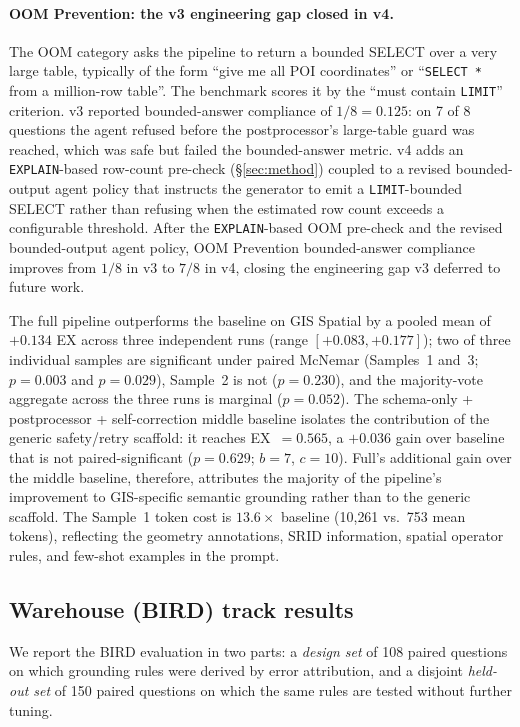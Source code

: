 \documentclass[11pt]{article}
\begin{document}
\paragraph{OOM Prevention: the v3 engineering gap closed in v4.} The OOM category asks the pipeline to return a bounded SELECT over a very large table, typically of the form ``give me all POI coordinates'' or ``\texttt{SELECT *} from a million-row table''. The benchmark scores it by the ``must contain \texttt{LIMIT}'' criterion. v3 reported bounded-answer compliance of $1/8 = 0.125$: on 7 of 8 questions the agent refused before the postprocessor's large-table guard was reached, which was safe but failed the bounded-answer metric. v4 adds an \texttt{EXPLAIN}-based row-count pre-check (\S\ref{sec:method}) coupled to a revised bounded-output agent policy that instructs the generator to emit a \texttt{LIMIT}-bounded SELECT rather than refusing when the estimated row count exceeds a configurable threshold. After the \texttt{EXPLAIN}-based OOM pre-check and the revised bounded-output agent policy, OOM Prevention bounded-answer compliance improves from $1/8$ in v3 to $7/8$ in v4, closing the engineering gap v3 deferred to future work.

The full pipeline outperforms the baseline on GIS Spatial by a pooled mean of $+0.134$ EX across three independent runs (range $[+0.083, +0.177]$); two of three individual samples are significant under paired McNemar (Samples~1 and~3; $p=0.003$ and $p=0.029$), Sample~2 is not ($p=0.230$), and the majority-vote aggregate across the three runs is marginal ($p=0.052$). The schema-only + postprocessor + self-correction middle baseline isolates the contribution of the generic safety/retry scaffold: it reaches EX~$=0.565$, a $+0.036$ gain over baseline that is not paired-significant ($p=0.629$; $b=7$, $c=10$). Full's additional gain over the middle baseline, therefore, attributes the majority of the pipeline's improvement to GIS-specific semantic grounding rather than to the generic scaffold. The Sample~1 token cost is $13.6\times$ baseline (10{,}261 vs.\ 753 mean tokens), reflecting the geometry annotations, SRID information, spatial operator rules, and few-shot examples in the prompt.

\subsection{Warehouse (BIRD) track results}
\label{sec:bird-results}

We report the BIRD evaluation in two parts: a \emph{design set} of 108 paired questions on which grounding rules were derived by error attribution, and a disjoint \emph{held-out set} of 150 paired questions on which the same rules are tested without further tuning.
\end{document}
